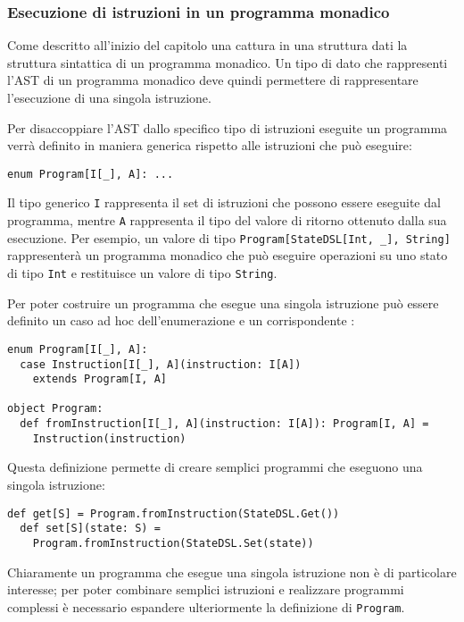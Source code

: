 \subsubsection{Esecuzione di istruzioni in un programma monadico}
Come descritto all'inizio del capitolo una  cattura in una struttura dati la struttura sintattica di un programma monadico.
Un tipo di dato che rappresenti l'AST di un programma monadico deve quindi permettere di rappresentare l'esecuzione di una singola istruzione.

Per disaccoppiare l'AST dallo specifico tipo di istruzioni eseguite un programma verrà definito in maniera generica rispetto alle istruzioni che può eseguire:
\begin{lstlisting}[language=scala3]
enum Program[I[_], A]: ...
\end{lstlisting}
Il tipo generico \lstinline{I} rappresenta il set di istruzioni che possono essere eseguite dal programma, mentre \lstinline{A} rappresenta il tipo del valore di ritorno ottenuto dalla sua esecuzione. Per esempio, un valore di tipo \lstinline{Program[StateDSL[Int, _], String]} rappresenterà un programma monadico che può eseguire operazioni su uno stato di tipo \lstinline{Int} e restituisce un valore di tipo \lstinline{String}.

Per poter costruire un programma che esegue una singola istruzione può essere definito un caso ad hoc dell'enumerazione e un corrispondente :
\begin{lstlisting}[language=scala3]
enum Program[I[_], A]:
  case Instruction[I[_], A](instruction: I[A])
    extends Program[I, A]

object Program:
  def fromInstruction[I[_], A](instruction: I[A]): Program[I, A] =
    Instruction(instruction)
\end{lstlisting}

Questa definizione permette di creare semplici programmi che eseguono una singola istruzione:
\begin{lstlisting}[language=scala3]
  def get[S] = Program.fromInstruction(StateDSL.Get())
  def set[S](state: S) =
    Program.fromInstruction(StateDSL.Set(state))
\end{lstlisting}

Chiaramente un programma che esegue una singola istruzione non è di particolare interesse; per poter combinare semplici istruzioni e realizzare programmi complessi è necessario espandere ulteriormente la definizione di \lstinline{Program}.


